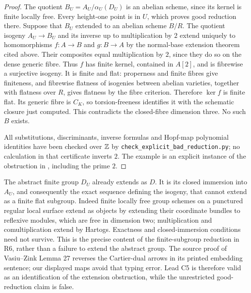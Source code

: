 \begin{proof}
The quotient $B_U=A_U/\alpha_U(D_U)$ is an abelian scheme, since its kernel is finite locally free. Every height-one point is in $U$, which proves good reduction there. Suppose that $B_U$ extended to an abelian scheme $B/R$. The quotient isogeny $A_U\to B_U$ and its inverse up to multiplication by $2$ extend uniquely to homomorphisms $f:A\to B$ and $g:B\to A$ by the normal-base extension theorem cited above. Their composites equal multiplication by $2$, since they do so on the dense generic fibre. Thus $f$ has finite kernel, contained in $A[2]$, and is fibrewise a surjective isogeny. It is finite and flat: properness and finite fibres give finiteness, and fibrewise flatness of isogenies between abelian varieties, together with flatness over $R$, gives flatness by the fibre criterion. Therefore $\ker f$ is finite flat. Its generic fibre is $C_K$, so torsion-freeness identifies it with the schematic closure just computed. This contradicts the closed-fibre dimension three. No such $B$ exists.

All substitutions, discriminants, inverse formulas and Hopf-map polynomial identities have been checked over $\mathbb Z$ by \texttt{check\_explicit\_bad\_reduction.py}; no calculation in that certificate inverts $2$. The example is an explicit instance of the obstruction in \citet[Lemma 27 and Theorem 28(ii)]{c_vasiuzink2010}, including the prime $2$.
\end{proof}

\begin{remark}
\label{c:subgroup-versus-object}
The abstract finite group $D_U$ already extends as $D$. It is its closed immersion into $A_U$, and consequently the exact sequence defining the isogeny, that cannot extend as a finite flat subgroup. Indeed finite locally free group schemes on a punctured regular local surface extend as objects by extending their coordinate bundles to reflexive modules, which are free in dimension two; multiplication and comultiplication extend by Hartogs. Exactness and closed-immersion conditions need not survive. This is the precise content of the finite-subgroup reduction in R6, rather than a failure to extend the abstract group. The source proof of Vasiu--Zink Lemma 27 reverses the Cartier-dual arrows in its printed embedding sentence; our displayed maps avoid that typing error. Lead C5 is therefore valid as an identification of the extension obstruction, while the unrestricted good-reduction claim is false.
\end{remark}

